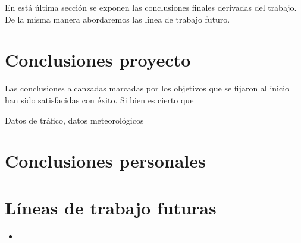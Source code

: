 
En está última sección se exponen las conclusiones finales derivadas del trabajo. De la misma manera abordaremos las línea de trabajo futuro.


\section{Conclusiones proyecto}\label{conclusiones_proyecto}
Las conclusiones alcanzadas marcadas por los objetivos que se fijaron al inicio han sido satisfacidas con éxito. Si bien es cierto que 

Datos de tráfico, datos meteorológicos


\section{Conclusiones personales}\label{conclusiones_personales}


\section{Líneas de trabajo futuras}\label{lineas_futuras}

\begin{itemize}
	\item  
\end{itemize}